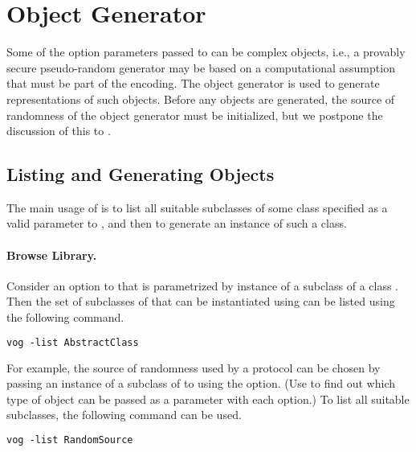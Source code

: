 \documentclass[11pt]{article}
\begin{document}
\section{Object Generator}\label{sect:objgen}

Some of the option parameters passed to \vmni{} can be complex
objects, i.e., a provably secure pseudo-random generator may be based
on a computational assumption that must be part of the encoding. The
object generator \vog{} is used to generate representations of such
objects. Before any objects are generated, the source of randomness of
the object generator must be initialized, but we postpone the
discussion of this to .

\subsection{Listing and Generating Objects}

The main usage of \vog{} is to list all suitable subclasses of some
class specified as a valid parameter to \vmni{}, and then to generate
an instance of such a class.

\paragraph{Browse Library.}

Consider an option to \vmni{} that is parametrized by instance of a
subclass of a class . Then the set of subclasses
of  that can be instantiated using \vog{} can be
listed using the following command.

\vspace{0.3cm}
\begin{lstlisting}[frame=single,language=xml,
basicstyle=\tt,showstringspaces=false]
vog -list AbstractClass
\end{lstlisting}

\vspace{0.2cm}
\noindent
For example, the source of randomness used by a protocol can be chosen
by passing an instance of a subclass of
 to \vmni{} using the
 option. (Use  to find out which type of
object can be passed as a parameter with each option.) To list all
suitable subclasses, the following command can be used.

\vspace{0.3cm}
\begin{lstlisting}[frame=single,language=xml,
basicstyle=\tt,showstringspaces=false]
vog -list RandomSource
\end{lstlisting}
\end{document}
